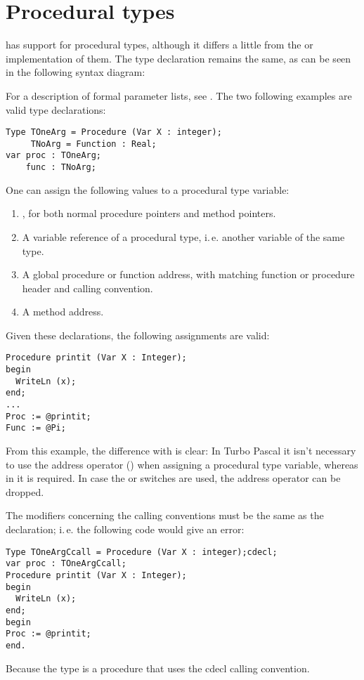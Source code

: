 \section{Procedural types}
\fpc has support for procedural types, although it differs a little from
the \tp or \delphi implementation of them. The type declaration remains the
same, as can be seen in the following syntax diagram:

For a description of formal parameter lists, see .
The two following examples are valid type declarations:
\begin{verbatim}
Type TOneArg = Procedure (Var X : integer);
     TNoArg = Function : Real;
var proc : TOneArg;
    func : TNoArg;
\end{verbatim}
One can assign the following values to a procedural type variable:
\begin{enumerate}
\item {}, for both normal procedure pointers and method pointers.
\item A variable reference of a procedural type, i.\,e. another variable of
the same type.
\item A global procedure or function address, with matching function or
procedure header and calling convention.
\item A method address.
\end{enumerate}
Given these declarations, the following assignments are valid:
\begin{verbatim}
Procedure printit (Var X : Integer);
begin
  WriteLn (x);
end;
...
Proc := @printit;
Func := @Pi;
\end{verbatim}
From this example, the difference with \tp is clear: In Turbo
Pascal it isn't necessary to use the address operator ()
when assigning a procedural type variable, whereas in \fpc it is required.
In case the  or  switches are used, the address
operator can be dropped.
\begin{remark} The modifiers concerning the calling conventions
must be the same as the declaration;
i.\,e. the following code would give an error:
\begin{verbatim}
Type TOneArgCcall = Procedure (Var X : integer);cdecl;
var proc : TOneArgCcall;
Procedure printit (Var X : Integer);
begin
  WriteLn (x);
end;
begin
Proc := @printit;
end.
\end{verbatim}
Because the  type is a procedure that uses the cdecl
calling convention.
\end{remark}

